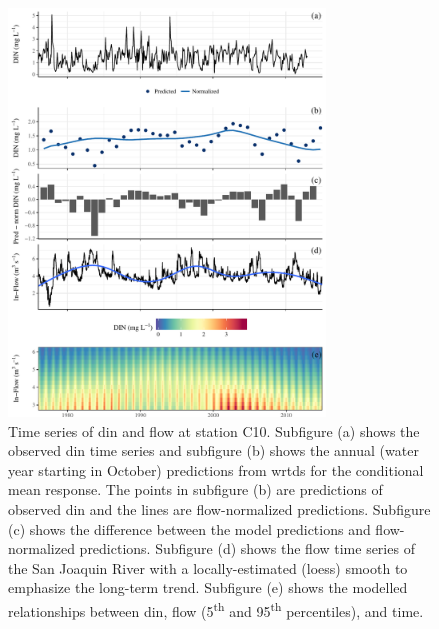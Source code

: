 \documentclass[journal = esthag, manuscript = article]{achemso}\usepackage[]{graphicx}\usepackage[]{color}
\begin{document}
\begin{figure}[!ht]

{\centering \includegraphics[width=0.75\textwidth]{figs/dinc10-1} 

}

\caption{Time series of \ac{din} and flow at station C10.  Subfigure (a) shows the observed \ac{din} time series and subfigure (b) shows the annual (water year starting in October) predictions from \ac{wrtds} for the conditional mean response.  The points in subfigure (b) are predictions of observed \ac{din} and the lines are flow-normalized predictions.  Subfigure (c) shows the difference between the model predictions and flow-normalized predictions.  Subfigure (d) shows the flow time series of the San Joaquin River with a locally-estimated (loess) smooth to emphasize the long-term trend. Subfigure (e) shows the modelled relationships between \ac{din}, flow (5\textsuperscript{th} and 95\textsuperscript{th} percentiles), and time.}\label{fig:dinc10}
\end{figure}
\end{document}
